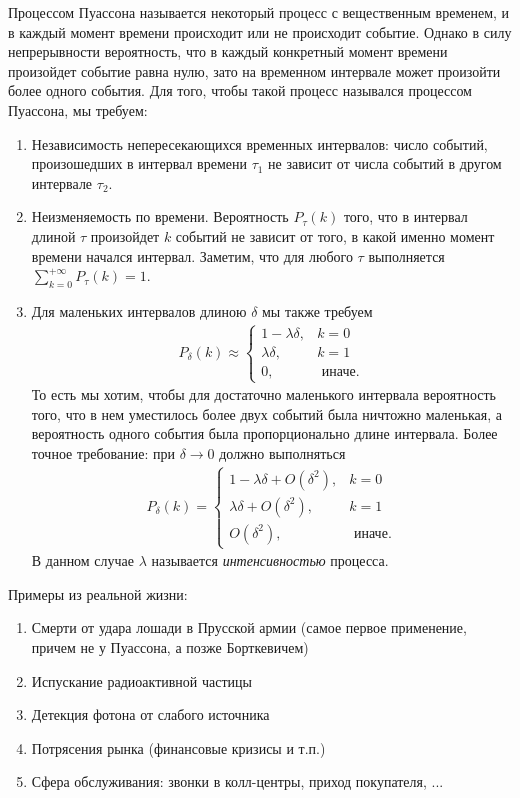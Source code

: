 \documentclass[12pt]{article}
\begin{document}
Процессом Пуассона называется некоторый процесс с вещественным временем, и в каждый момент времени происходит или не происходит событие. Однако в силу непрерывности вероятность, что в каждый конкретный момент времени произойдет событие равна нулю, зато на временном интервале может произойти более одного события. Для того, чтобы такой процесс назывался процессом Пуассона, мы требуем:
\begin{enumerate}
  \item Независимость непересекающихся временных интервалов: число событий, произошедших в интервал времени $\tau_1$ не зависит от числа событий в другом интервале $\tau_2$.
  \item Неизменяемость по времени. Вероятность $P_\tau(k)$ того, что в интервал длиной $\tau$ произойдет $k$ событий не зависит от того, в какой именно момент времени начался интервал. Заметим, что для любого $\tau$ выполняется $\sum_{k = 0}^{+\infty} P_\tau(k) = 1$.
  \item Для маленьких интервалов длиною $\delta$ мы также требуем
  \begin{align*}
    P_\delta(k) \approx \begin{cases}
      1 - \lambda\delta, &k = 0 \\
      \lambda\delta, &k = 1 \\
      0, &\text{ иначе.}
    \end{cases}
  \end{align*}  
  То есть мы хотим, чтобы для достаточно маленького интервала вероятность того, что в нем уместилось более двух событий была ничтожно маленькая, а вероятность одного события была пропорционально длине интервала. Более точное требование: при $\delta \to 0$ должно выполняться
  \begin{align*}
    P_\delta(k) = \begin{cases}
      1 - \lambda\delta + O(\delta^2), &k = 0 \\
      \lambda\delta + O(\delta^2), &k = 1 \\
      O(\delta^2), &\text{ иначе.}
    \end{cases}
  \end{align*}
  В данном случае $\lambda$ называется \emph{интенсивностью} процесса.
\end{enumerate}

Примеры из реальной жизни:
\begin{enumerate}
  \item Смерти от удара лошади в Прусской армии (самое первое применение, причем не у Пуассона, а позже Борткевичем)
  \item Испускание радиоактивной частицы
  \item Детекция фотона от слабого источника
  \item Потрясения рынка (финансовые кризисы и т.п.)
  \item Сфера обслуживания: звонки в колл-центры, приход покупателя, ...
\end{enumerate}
\end{document}

